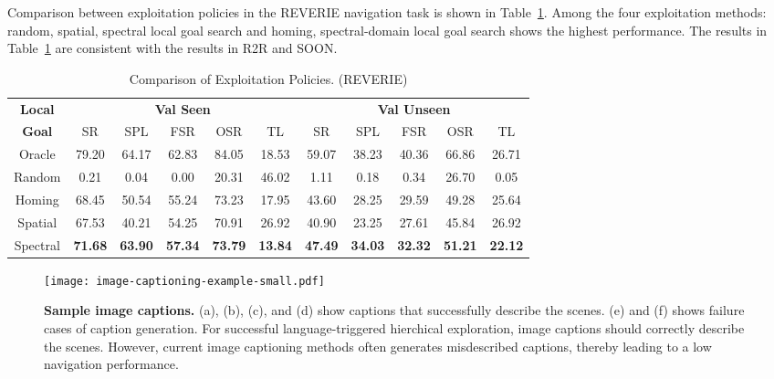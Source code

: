 \documentclass[10pt,twocolumn,letterpaper]{article}
\begin{document}
Comparison between exploitation policies in the REVERIE navigation task is shown in Table~\ref{tab:localgoal_compare_results-reverie}. Among the four exploitation methods: random, spatial, spectral local goal search and homing, spectral-domain local goal search shows the highest performance. The results in Table~\ref{tab:localgoal_compare_results-reverie} are consistent with the results in R2R and SOON.
\begin{table}[htb!]
\renewcommand{\arraystretch}{1.0}
\setlength{\tabcolsep}{2.2pt}
\fontsize{7}{8}\selectfont
\begin{tabular}{c|ccccc|ccccc}
\toprule
\textbf{Local} & \multicolumn{5}{c|}{\textbf{Val Seen}} & \multicolumn{5}{c}{\textbf{Val Unseen}}\\
\textbf{Goal} & SR & SPL & FSR & OSR & TL & SR & SPL & FSR & OSR & TL \\ \hline\hline
Oracle  & 79.20 & 64.17 & 62.83 & 84.05 & 18.53 & 59.07 & 38.23 & 40.36 & 66.86 & 26.71 \\ \hline
Random   & 0.21 & 0.04 & 0.00 & 20.31 & 46.02 & 1.11 & 0.18 & 0.34 & 26.70 & 0.05 \\
Homing   & 68.45 & 50.54 & 55.24 & 73.23 & 17.95 & 43.60 & 28.25 & 29.59 & 49.28 & 25.64 \\
Spatial  & 67.53 & 40.21 & 54.25 & 70.91 & 26.92 & 40.90 & 23.25 & 27.61 & 45.84 & 26.92 \\
\rowcolor{LightCyan}Spectral  & \textbf{71.68} & \textbf{63.90} & \textbf{57.34} & \textbf{73.79} & \textbf{13.84} & \textbf{47.49} & \textbf{34.03} & \textbf{32.32} & \textbf{51.21} & \textbf{22.12} \\
\bottomrule
\end{tabular}\vspace{-0.2cm}
\caption{\small Comparison of Exploitation Policies. (REVERIE)
}
\label{tab:localgoal_compare_results-reverie}\vspace{-0.2cm}
\end{table}

\begin{figure}[t!]{\centering\texttt{[image: image-captioning-example-small.pdf]}}\centering
\caption{{\textbf{Sample image captions.} (a), (b), (c), and (d) show captions that successfully describe the scenes. (e) and (f) shows failure cases of caption generation. For successful language-triggered hierchical exploration, image captions should correctly describe the scenes. However, current image captioning methods often generates misdescribed captions, thereby leading to a low navigation performance.
}}\label{fig:image-caption-example} \vspace{-0.5cm}
\end{figure}
\end{document}
